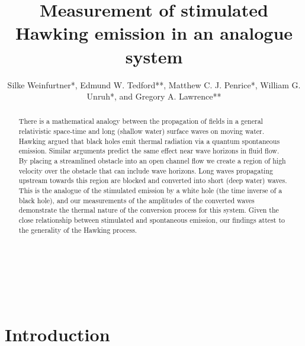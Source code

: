 \documentclass[12pt,aps%
]{revtex4}
\begin{document}
\title{Measurement of stimulated Hawking emission in an analogue system
  }

\author{Silke Weinfurtner*, Edmund W. Tedford**, Matthew C. J. Penrice*,
William G. Unruh*, and Gregory A. Lawrence**
}
 

~

~

\begin{abstract}



There is a mathematical analogy between the propagation of fields in a general
relativistic space-time and long (shallow water) surface waves on moving
water.  Hawking argued that black holes emit thermal radiation via a quantum
spontaneous emission.  Similar arguments predict the same effect near wave
horizons in fluid flow. By placing a streamlined obstacle into an open channel
flow we create a region of high velocity over the obstacle that can include
wave horizons.  Long waves propagating upstream towards this region are
blocked and converted into short (deep water) waves.  This is the analogue of
the stimulated emission by a white hole (the time inverse of a black hole),
and our measurements of the amplitudes of the converted waves demonstrate the
thermal nature of the conversion process for this system.  Given the close
relationship between stimulated and spontaneous emission, our findings attest
to the generality of the Hawking process.
\end{abstract}

\maketitle
\section{Introduction}
\end{document}
